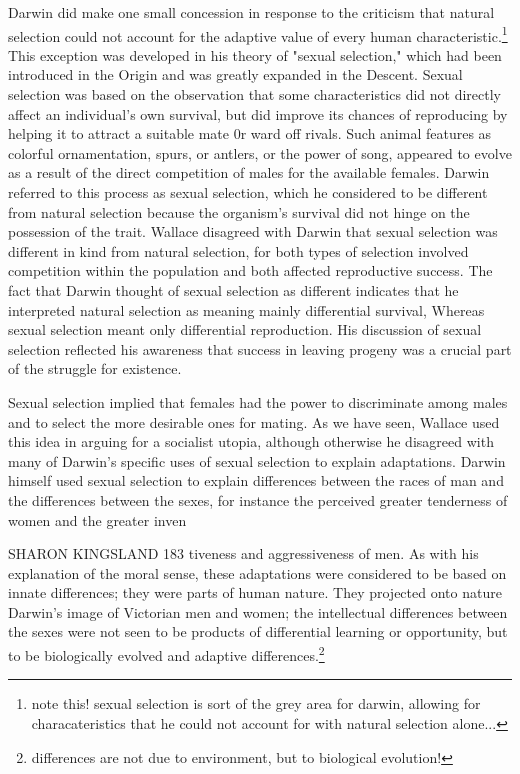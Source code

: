 \documentclass[12pt]{letter}
\begin{document}
Darwin did make one small concession in response to the criticism that natural selection could not account for the adaptive value of every human characteristic.\footnote{note this! sexual selection is sort of the grey area for darwin, allowing for characateristics that he could not account for with natural selection alone...} This exception was developed in his theory of "sexual selection," which had been introduced in the Origin and was greatly expanded in the Descent. Sexual selection was based on the observation that some characteristics did not directly affect an individual’s own survival, but did improve its chances of reproducing by helping it to attract a suitable mate 0r ward off rivals. Such animal features as colorful ornamentation, spurs, or antlers, or the power of song, appeared to evolve as a result of the direct competition of males for the available females. Darwin referred to this process as sexual selection, which he considered to be different from natural selection because the organism’s survival did not hinge on the possession of the trait. Wallace disagreed with Darwin that sexual selection was different in kind from natural selection, for both types of selection involved competition within the population and both affected reproductive success. The fact that Darwin thought of sexual selection as different indicates that he interpreted natural selection as meaning mainly differential survival, Whereas sexual selection meant only differential reproduction. His discussion of sexual selection reflected his awareness that success in leaving progeny was a crucial part of the struggle for existence.

Sexual selection implied that females had the power to discriminate among males and to select the more desirable ones for mating. As we have seen, Wallace used this idea in arguing for a socialist utopia, although otherwise he disagreed with many of Darwin’s specific uses of sexual selection to explain adaptations. Darwin himself used sexual selection to explain differences between the races of man and the differences between the sexes, for instance the perceived greater tenderness of women and the greater inven


SHARON KINGSLAND 183
tiveness and aggressiveness of men. As with his explanation of the moral sense, these adaptations were considered to be based on innate differences; they were parts of human nature. They projected onto nature Darwin’s image of Victorian men and women; the intellectual differences between the sexes were not seen to be products of differential learning or opportunity, but to be biologically evolved and adaptive differences.\footnote{differences are not due to environment, but to biological evolution!}
\end{document}
